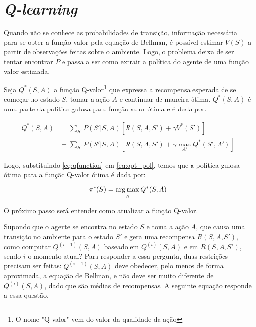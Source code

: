 
\section{\textit{Q-learning}}
\label{sec:ql}

Quando não se conhece as probabilidades de transição, informação necessária para se obter a função valor pela equação de Bellman, é possível estimar $V(S)$ a partir de observações feitas sobre o ambiente.
Logo, o problema deixa de ser tentar encontrar $P$ e passa a ser como extrair a política do agente de uma função valor estimada.

Seja $Q^{*}(S,A)$ a função Q-valor\footnote{O nome "Q-valor"{} vem do valor da qualidade da ação} que expressa a recompensa esperada de se começar no estado $S$, tomar a ação $A$ e continuar de maneira ótima. $Q^{*}(S,A)$ é uma parte da política gulosa para função valor ótima e é dada por:

\begin{equation} \label{eq:qfunction}
\begin{align*}
Q^{*}(S,A) &= \sum_{S'}P(S'|S,A)[R(S,A,S') + \gamma V^{*}(S')] \\
        &= \sum_{S'}P(S'|S,A)[R(S,A,S') + \gamma \max_{A'}Q^{*}(S',A')]
\end{align*}
\end{equation}

Logo, substituindo \ref{eq:qfunction} em \ref{eq:opt_pol}, temos que a política gulosa ótima para a função Q-valor ótima é dada por:

\begin{equation} \label{eq:q_opt_pol}
\pi^{*}(S) = \operatorname*{arg\,max}_{A}Q^{*}(S,A)
\end{equation}

O próximo passo será entender como atualizar a função Q-valor.

Supondo que o agente se encontra no estado $S$ e toma a ação $A$, que causa uma transição no ambiente para o estado $S'$ e gera uma recompensa $R(S,A,S')$, como computar $Q^{(i+1)}(S,A)$ baseado em $Q^{(i)}(S,A)$ e em $R(S,A,S')$, sendo $i$ o momento atual?
Para responder a essa pergunta, duas restrições precisam ser feitas: $Q^{(i+1)}(S,A)$ deve obedecer, pelo menos de forma aproximada, a equação de Bellman, e não deve ser muito diferente de $Q^{(i)}(S,A)$, dado que são médias de recompensas.
A seguinte equação responde a essa questão.

